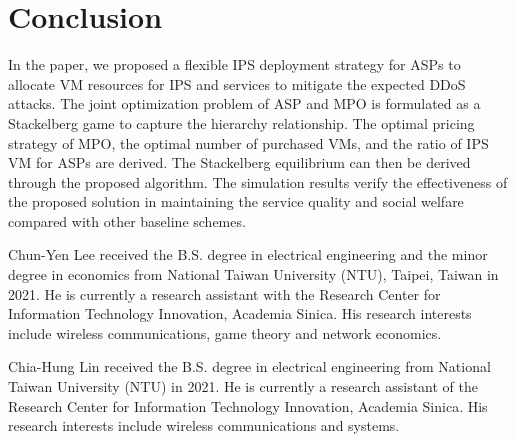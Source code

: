 \documentclass[10pt,journal, compsoc]{IEEEtran}
\begin{document}

\section{Conclusion} \label{sec:conclusion}
In the paper, we proposed a flexible IPS deployment strategy for ASPs to allocate VM resources for IPS and services to mitigate the expected DDoS attacks. The joint optimization problem of ASP and MPO is formulated as a Stackelberg game to capture the hierarchy relationship. The optimal pricing strategy of MPO, the optimal number of purchased VMs, and the ratio of IPS VM for ASPs are derived. The Stackelberg equilibrium can then be derived through the proposed algorithm. The simulation results verify the effectiveness of the proposed solution in maintaining the service quality and social welfare compared with other baseline schemes.




\begin{IEEEbiography}{Chun-Yen Lee}
received the B.S. degree in electrical engineering and the minor degree in economics from National Taiwan University (NTU), Taipei, Taiwan in 2021. He is currently a research assistant with the Research Center for Information Technology Innovation, Academia Sinica. His research interests include wireless communications, game theory and network economics.
\end{IEEEbiography}


\begin{IEEEbiography}{Chia-Hung Lin}
received the B.S. degree in electrical engineering from National Taiwan University (NTU) in 2021. He is currently a research assistant of the Research Center for Information Technology Innovation, Academia Sinica. His research interests include wireless communications and systems.
\end{IEEEbiography}
\end{document}
